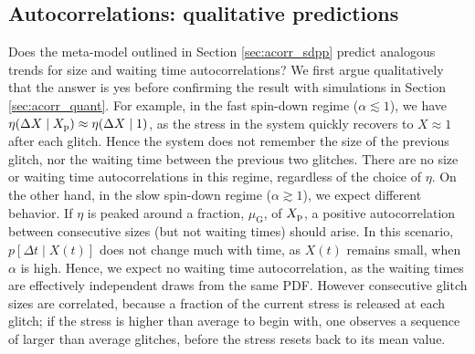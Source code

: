 \subsection{Autocorrelations: qualitative predictions}
\label{sec:acorr_qual}
Does the meta-model outlined in Section \ref{sec:acorr_sdpp} predict analogous trends for size and waiting time autocorrelations? We first argue qualitatively that the answer is yes before confirming the result with simulations in Section \ref{sec:acorr_quant}. For example, in the fast spin-down regime ($\alpha \lesssim 1$), we have $\eta(\Delta X \mid X_{\textrm{p}}) \approx \eta(\Delta X \mid 1)$, as the stress in the system quickly recovers to $X \approx 1$ after each glitch. Hence the system does not remember the size of the previous glitch, nor the waiting time between the previous two glitches. There are no size or waiting time autocorrelations in this regime, regardless of the choice of $\eta$. On the other hand, in the slow spin-down regime ($\alpha \gtrsim 1$), we expect different behavior. If $\eta$ is peaked around a fraction, $\mu_\textrm{G}$, of $X_{\textrm{p}}$, a positive autocorrelation between consecutive sizes (but not waiting times) should arise. In this scenario, $p[\Delta t \mid X(t)]$ does not change much with time, as $X(t)$ remains small, when $\alpha$ is high. Hence, we expect no waiting time autocorrelation, as the waiting times are effectively independent draws from the same PDF. However consecutive glitch sizes are correlated, because a fraction of the current stress is released at each glitch; if the stress is higher than average to begin with, one observes a sequence of larger than average glitches, before the stress resets back to its mean value. 

